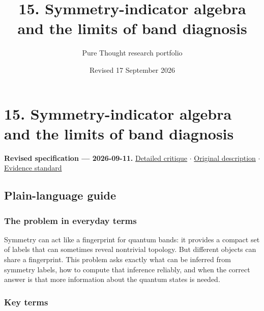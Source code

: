 \documentclass[
  11pt,
]{article}
\title{15. Symmetry-indicator algebra and the limits of band diagnosis}
\author{Pure Thought research portfolio}
\date{Revised 17 September 2026}
\begin{document}
\maketitle
\thispagestyle{empty}
\clearpage

\section{15. Symmetry-indicator algebra and the limits of band
diagnosis}

\textbf{Revised specification --- 2026-09-11.}
\href{https://github.com/rick-stevens-ai/Pure-Thought/blob/main/reviews/15-Topological-Quantum-Chemistry.md}{Detailed
critique} \ensuremath{\cdot}
\href{https://github.com/rick-stevens-ai/Pure-Thought/blob/main/archive/original-PRDs/15-Topological-Quantum-Chemistry.md}{Original
description} \ensuremath{\cdot}
\href{https://github.com/rick-stevens-ai/Pure-Thought/blob/main/reviews/EVIDENCE-STANDARD.md}{Evidence
standard}

\subsection{Plain-language guide}

\subsubsection{The problem in everyday terms}

Symmetry can act like a fingerprint for quantum bands: it provides a
compact set of labels that can sometimes reveal nontrivial topology. But
different objects can share a fingerprint. This problem asks exactly
what can be inferred from symmetry labels, how to compute that inference
reliably, and when the correct answer is that more information about the
quantum states is needed.

\subsubsection{Key terms}
\end{document}
